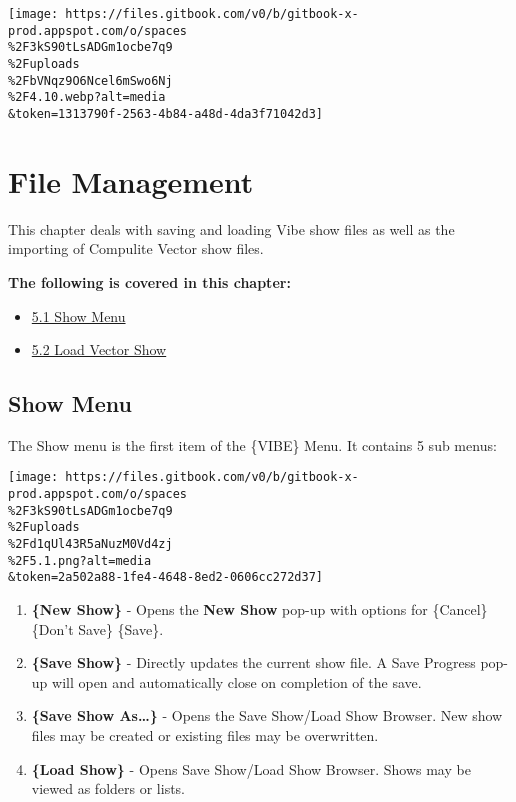 \documentclass[
]{article}
\providecommand{\tightlist}{%
  \setlength{\itemsep}{0pt}\setlength{\parskip}{0pt}}
\begin{document}
\texttt{[image: https://files.gitbook.com/v0/b/gitbook-x-prod.appspot.com/o/spaces\\\%2F3kS90tLsADGm1ocbe7q9\\\%2Fuploads\\\%2FbVNqz9O6Ncel6mSwo6Nj\\\%2F4.10.webp?alt=media\\\&token=1313790f-2563-4b84-a48d-4da3f71042d3]}

\hypertarget{file-management}{%
\section{File Management}\label{file-management}}

This chapter deals with saving and loading Vibe show files as well as the importing of Compulite Vector show files.

\textbf{The following is covered in this chapter:}

\begin{itemize}
\tightlist
\item
  \href{https://vibemanual.compulite.com/file-management.html\#show-menu}{5.1 Show Menu}
\item
  \href{https://vibemanual.compulite.com/file-management.html\#load-vector-show}{5.2 Load Vector Show}
\end{itemize}

\hypertarget{show-menu}{%
\subsection{Show Menu}\label{show-menu}}

The Show menu is the first item of the \{VIBE\} Menu. It contains 5 sub menus:

\texttt{[image: https://files.gitbook.com/v0/b/gitbook-x-prod.appspot.com/o/spaces\\\%2F3kS90tLsADGm1ocbe7q9\\\%2Fuploads\\\%2Fd1qUl43R5aNuzM0Vd4zj\\\%2F5.1.png?alt=media\\\&token=2a502a88-1fe4-4648-8ed2-0606cc272d37]}

\begin{enumerate}
\def\labelenumi{\arabic{enumi}.}
\item
  \textbf{\{New Show\}} - Opens the \textbf{New Show} pop-up with options for \{Cancel\} \{Don't Save\} \{Save\}.
\item
  \textbf{\{Save Show\}} - Directly updates the current show file. A Save Progress pop-up will open and automatically close on completion of the save.
\item
  \textbf{\{Save Show As\ldots\}} - Opens the Save Show/Load Show Browser. New show files may be created or existing files may be overwritten.
\item
  \textbf{\{Load Show\}} - Opens Save Show/Load Show Browser. Shows may be viewed as folders or lists.
\end{enumerate}
\end{document}
